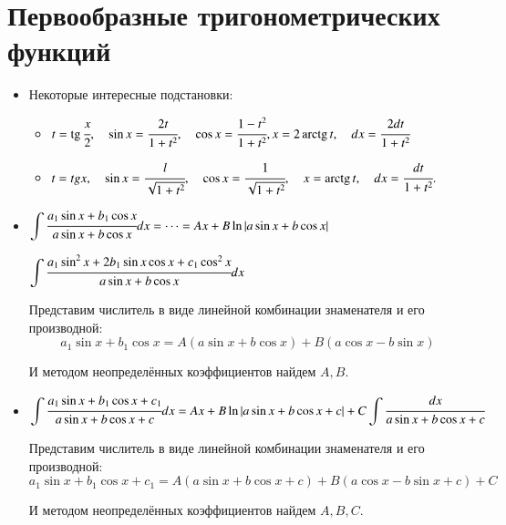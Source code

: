 \documentclass[twoside, a4paperpt]{extarticle}
\begin{document}
\begin{itemize}
\end{itemize}
\section*{Первообразные тригонометрических функций}
\begin{itemize}
    \item Некоторые интересные подстановки:
    \begin{itemize}
        \item $ t=\operatorname{tg} \cfrac{x}{2}, \quad \sin x=\cfrac{2 t}{1+t^{2}}, \quad \cos x=\cfrac{1-t^{2}}{1+t^{2}}, x=2 \operatorname{arctg} t, \quad d x=\cfrac{2 d t}{1+t^{2}}$
    
        \item $t = tg x, \quad \sin x=\cfrac{l}{\sqrt{1+t^{2}}}, \quad \cos x=\cfrac{1}{\sqrt{1+t^{2}}}, \quad x=\operatorname{arctg} t, \quad d x=\cfrac{d t}{1+t^{2}} .$
    \end{itemize}

    \item $\displaystyle \int \cfrac{a_{1} \sin x+b_{1} \cos x}{a \sin x+b \cos x} d x =\cdots = A x+B \ln |a \sin x+b \cos x| $
    
    $\displaystyle \int \cfrac{a_{1} \sin ^{2} x+2 b_{1} \sin x \cos x+c_{1} \cos ^{2} x}{a \sin x+b \cos x} d x$
    
    Представим числитель в виде линейной комбинации знаменателя и его производной: 
    $$a_{1} \sin x+b_{1} \cos x=A(a \sin x+b \cos x)+B(a \cos x-b \sin x)$$

    И методом неопределённых коэффициентов найдем $A, B$.

    \item $\displaystyle \int \cfrac{a_{1} \sin x+b_{1} \cos x+c_{1}}{a \sin x+b \cos x+c} d x=A x+B \ln |a \sin x+b \cos x+c|+C \displaystyle \int \cfrac{d x}{a \sin x+b \cos x+c} $
    
    Представим числитель в виде линейной комбинации знаменателя и его производной: 
    $$ a_{1} \sin x+b_{1} \cos x+c_{1}=A(a \sin x+b \cos x+c)+B(a \cos x-b \sin x + c)+C $$

    И методом неопределённых коэффициентов найдем $A, B, C$.
    

\end{itemize}
\end{document}
